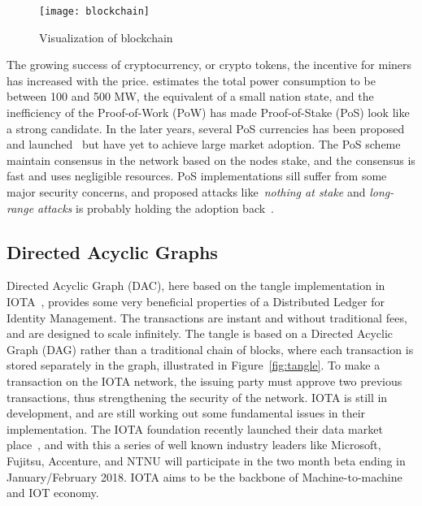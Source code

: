 \begin{figure}[ht]
    \centering
    \texttt{[image: blockchain]}
    \caption{Visualization of blockchain \cite{bitcoin2008}}
    \label{fig:blockchain}
\end{figure}

The growing success of cryptocurrency, or crypto tokens, the incentive for miners has increased with the price. \cite{VRANKEN20171} estimates the total power consumption to be between 100 and 500 MW, the equivalent of a small nation state, and the inefficiency of the Proof-of-Work (PoW) has made Proof-of-Stake (PoS) look like a strong candidate. In the later years, several PoS currencies has been proposed and launched~\cite{Li2017,nxt_whitepaper,blackcoin_pos} but have yet to achieve large market adoption. The PoS scheme maintain consensus in the network based on the nodes stake, and the consensus is fast and uses negligible resources. PoS implementations sill suffer from some major security concerns, and proposed attacks like~\textit{nothing at stake} and \textit{long-range attacks} is probably holding the adoption back~\cite{Li2017}.

\subsection{Directed Acyclic Graphs }

Directed Acyclic Graph (DAC), here based on the tangle implementation in IOTA~\cite{IOTA_Whitepaper}, provides some very beneficial properties of a Distributed Ledger for Identity Management. The transactions are instant and without traditional fees, and are designed to scale infinitely. The tangle is based on a Directed Acyclic Graph (DAG) rather than a traditional chain of blocks, where each transaction is stored separately in the graph, illustrated in Figure~\ref{fig:tangle}. To make a transaction on the IOTA network, the issuing party must approve two previous transactions, thus strengthening the security of the network. IOTA is still in development, and are still working out some fundamental issues in their implementation. The IOTA foundation recently launched their data market place~\cite{IOTA_Marketplace}, and with this a series of well known industry leaders like Microsoft, Fujitsu, Accenture, and NTNU will participate in the two month beta ending in January/February 2018. IOTA aims to be the backbone of Machine-to-machine and IOT economy.

